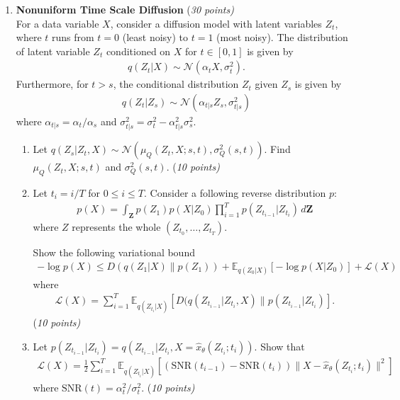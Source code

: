 \documentclass[12pt]{article}
\newcommand{\field}[1]{\mathbb{#1}}
\begin{document}
\begin{enumerate}

\item {\bf Nonuniform Time Scale Diffusion} {(\it 30 points)}\\
For a data variable $X$, consider a diffusion model with latent variables $Z_t$,
where $t$ runs from $t=0$ (least noisy) to $t=1$ (most noisy).
The distribution of latent variable $Z_t$ conditioned on $X$ for $t\in[0, 1]$ is given by
\begin{align*}
    q(Z_t|X)\sim \mathcal{N}(\alpha_t X, \sigma_t^2).
\end{align*}
Furthermore, for $t>s$, the conditional distribution $Z_t$ given $Z_s$ is given by
\begin{align*}
    q(Z_t|Z_s) \sim \mathcal{N}(\alpha_{t|s} Z_s, \sigma_{t|s}^2)
\end{align*}
where $\alpha_{t|s} = \alpha_t/\alpha_s$ and $\sigma_{t|s}^2 = \sigma_t^2 - \alpha_{t|s}^2\sigma_s^2$.
\begin{enumerate}
\item Let $q(Z_s|Z_t, X) \sim \mathcal{N}(\mu_Q(Z_t, X;s, t), \sigma_Q^2(s, t))$.
Find $\mu_Q(Z_t, X;s, t)$ and $\sigma_Q^2(s, t)$.  {(\it 10 points)}
\item Let $t_i = i/T$ for $0\leq i\leq T$.
Consider a following reverse distribution $p$:
\begin{align*}
    p(X) = \int_{\mathbf{Z}} p(Z_1) p(X|Z_0) \prod_{i=1}^T p(Z_{t_{i-1}}|Z_{t_i})\, d\mathbf{Z}
\end{align*}
where $Z$ represents the whole $(Z_{t_0}, \dots, Z_{t_T})$.

Show the following variational bound
\begin{align*}
    -\log p(X) \leq D(q(Z_1|X)\| p(Z_1)) + \field{E}_{q(Z_0|X)}[-\log p(X|Z_0)] + \mathcal{L}(X)
\end{align*}
where
\begin{align*}
    \mathcal{L}(X) = \sum_{i=1}^T \field{E}_{q(Z_{t_i}|X)} \left[D(q(Z_{t_{i-1}}|Z_{t_i}, X)\| p(Z_{t_{i-1}}|Z_{t_i})\right].
\end{align*}
{(\it 10 points)}
\item Let $p(Z_{t_{i-1}}|Z_{t_i}) = q(Z_{t_{i-1}}|Z_{t_i}, X=\hat{x}_{\theta}(Z_{t_i}; t_i))$.
Show that 
\begin{align*}
    \mathcal{L}(X) = \frac{1}{2} \sum_{i=1}^T \field{E}_{q(Z_{t_i}|X)} \left[\left(\mbox{SNR}(t_{i-1}) - \mbox{SNR}(t_i)\right) \|X - \hat{x}_\theta(Z_{t_i};t_i)\|^2\right]
\end{align*}
where $\mbox{SNR}(t) = \alpha_t^2 / \sigma_t^2$.
{(\it 10 points)}
\end{enumerate}


\end{enumerate}
\end{document}
